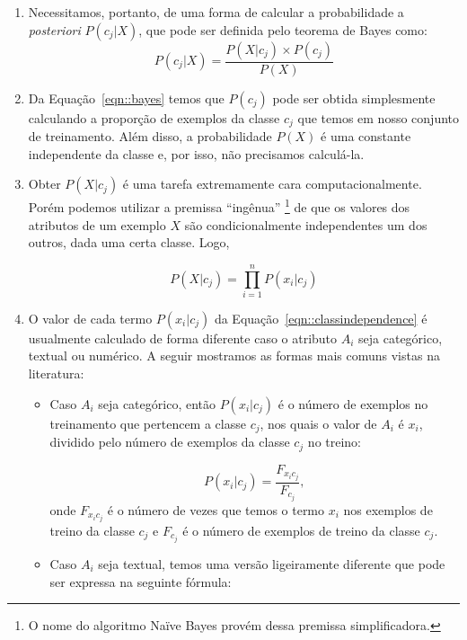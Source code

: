 \begin{enumerate}
    \item Necessitamos, portanto, de uma forma de calcular a probabilidade a \textit{posteriori} $P(c_j| X)$, que pode ser definida pelo teorema de Bayes como:
\begin{equation}\label{eqn::bayes}
   P(c_{j}|X) = \frac{P(X|c_j) \times P(c_j) }{P(X)}
\end{equation}

    \item Da Equação~\ref{eqn::bayes} temos que $P(c_j)$ pode ser obtida simplesmente calculando a proporção de exemplos da classe $c_j$ que temos em nosso conjunto de treinamento. Além disso, a probabilidade $P(X)$ é uma constante independente da classe e, por isso, não precisamos calculá-la.
       
    \item Obter $P(X|c_j)$ é uma tarefa extremamente cara computacionalmente. Porém podemos utilizar a premissa ``ingênua'' \footnote{O nome do algoritmo Naïve Bayes provém dessa premissa simplificadora.} de que os valores dos atributos de um exemplo $X$ são condicionalmente independentes um dos outros, dada uma certa classe. Logo,

\begin{equation}\label{eqn::classindependence}
   P(X|c_{j}) = \prod^{n}_{i=1}{P(x_i|c_j) }
\end{equation}

\item O valor de cada termo $P(x_i|c_j)$ da Equação~\ref{eqn::classindependence} é usualmente calculado de forma diferente caso o atributo $A_i$ seja categórico, textual ou numérico. A seguir mostramos as formas mais comuns vistas na literatura:
    \begin{itemize}

        \item Caso $A_i$ seja categórico, então $P(x_i|c_j)$ é o número de exemplos no treinamento que pertencem a classe $c_j$, nos quais o valor de $A_i$ é $x_i$, dividido pelo número de exemplos da classe $c_j$ no treino:

    \begin{equation}\label{eqn::nbcattexto}
        P(x_i|c_j) = \frac{ F_{x_{i}c_{j}} }{ F_{c_{j}} },
    \end{equation}
        onde $F_{x_{i}c_{j}}$ é o número de vezes que temos o termo $x_i$ nos exemplos de treino da classe $c_j$ e $F_{c_{j}}$ é o número de exemplos de treino da classe $c_j$.
        
        \item Caso $A_i$ seja textual, temos uma versão ligeiramente diferente que pode ser expressa na seguinte fórmula:


\end{itemize}
\end{enumerate}
